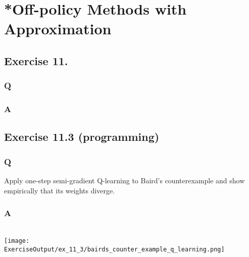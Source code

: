 \section{*Off-policy Methods with Approximation}

\subsection{Exercise 11.}
\subsubsection{Q}
\subsubsection{A}

\subsection{Exercise 11.3 (programming)}
\subsubsection{Q}
Apply one-step semi-gradient Q-learning to Baird’s counterexample and show empirically that its weights diverge.

\subsubsection{A}
\ProgrammingExercise{}\\

\texttt{[image: \\ExerciseOutput/ex\_11\_3/bairds\_counter\_example\_q\_learning.png]}
